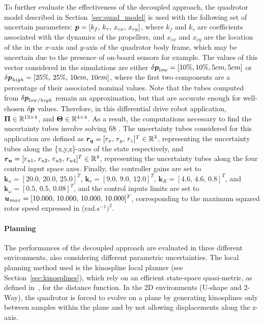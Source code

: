 To further evaluate the effectiveness of the decoupled approach, the quadrotor model described in Section~\ref{sec:quad_model} is used with the following set of uncertain parameters: $\boldsymbol{p} = [k_{f}, \, k_{\tau}, \, x_{cx}, \, x_{cy}]$, where $k_{f}$ and $k_{\tau}$ are coefficients associated with the dynamics of the propellers, and $x_{cx}$ and $x_{cy}$ are the location of the  in the $x$-axis and $y$-axis of the quadrotor body frame, which may be uncertain due to the presence of on-board sensors for example.
The values of this vector considered in the simulations are either $\delta\boldsymbol{p}_{low} = [10\% , 10\% ,  5cm , 5cm]$ or $\delta\boldsymbol{p}_{high} = [25\%, \, 25\%, \, 10cm, \, 10cm]$, where the first two components are a percentage of their associated nominal values. 
Note that the tubes computed from $\delta\boldsymbol{p}_{low/high}$ remain an approximation, but that are accurate enough for well-chosen $\delta\boldsymbol{p}$ values. 
Therefore, in this differential drive robot application, $\boldsymbol{\Pi} \in \mathbb{R}^{13\times4}$, and $\boldsymbol{\Theta} \in \mathbb{R}^{4\times4}$.
As a result, the computations necessary to find the uncertainty tubes involve solving 68 .
The uncertainty tubes considered for this application are defined as $\boldsymbol{r_q} = [r_x, \, r_y, \, r_z]^T \in \mathbb{R}^3$, representing the uncertainty tubes along the \{x,y,z\}-axes of the state respectively, and $\boldsymbol{r_u} = [r_{u1}, \, r_{u2}, \, r_{u3}, \, r_{u4}]^T \in \mathbb{R}^4$, representing the uncertainty tubes along the four control input space axes.
Finally, the controller gains are set to $\boldsymbol{k}_{x} = [20.0, \, 20.0, \, 25.0]^T$, $\boldsymbol{k}_{v}= [9.0, \, 9.0, \, 12.0]^T$, $\boldsymbol{k}_{R}=[4.6, \, 4.6, \, 0.8]^T$, and $\boldsymbol{k}_{\omega}=[0.5, \, 0.5, \, 0.08]^T$, and the control inputs limits are set to $\boldsymbol{u}_{max} = [10.000, \, 10.000, \, 10.000, \, 10.000]^T$, corresponding to the maximum squared rotor speed expressed in (rad.s$^{-1})^2$.

\paragraph{Planning}

The performances of the decoupled approach are evaluated in three different environments, also considering different parametric uncertainties.
The local planning method used is the kinospline local planner (see Section~\ref{sec:kinosplines}), which rely on an efficient state-space quasi-metric, as defined in~\cite{cKino}, for the distance function.
In the 2D environments (U-shape and 2-Way), the quadrotor is forced to evolve on a plane by generating kinosplines only between samples within the plane and by not allowing displacements along the z-axis.

